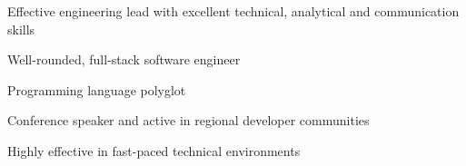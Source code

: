 

\begin{cvparagraph}

      \begin{cvitems}
        \item Effective engineering lead with excellent technical, analytical and communication skills
        \item Well-rounded, full-stack software engineer
        \item Programming language polyglot
        \item Conference speaker and active in regional developer communities
        \item Highly effective in fast-paced technical environments
      \end{cvitems}

\end{cvparagraph}
